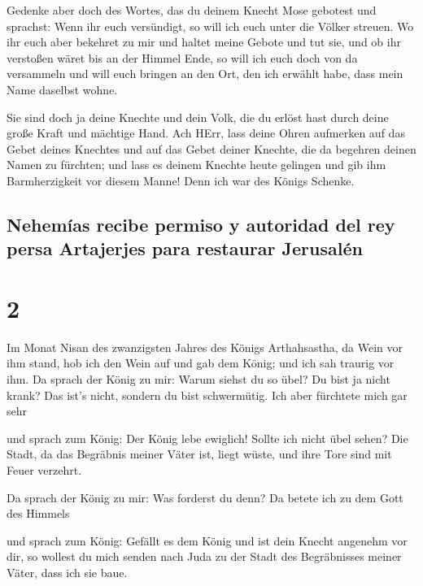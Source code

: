  Gedenke aber doch des Wortes, das du deinem Knecht Mose
gebotest und sprachst: Wenn ihr euch versündigt, so will ich euch unter
die Völker streuen.  Wo ihr euch aber bekehret zu mir und
haltet meine Gebote und tut sie, und ob ihr verstoßen wäret bis an der
Himmel Ende, so will ich euch doch von da versammeln und will euch
bringen an den Ort, den ich erwählt habe, dass mein Name daselbst wohne.

 Sie sind doch ja deine Knechte und dein Volk, die du
erlöst hast durch deine große Kraft und mächtige Hand. 
Ach HErr, lass deine Ohren aufmerken auf das Gebet deines Knechtes und
auf das Gebet deiner Knechte, die da begehren deinen Namen zu fürchten;
und lass es deinem Knechte heute gelingen und gib ihm Barmherzigkeit vor
diesem Manne! Denn ich war des Königs Schenke.

\hypertarget{nehemuxedas-recibe-permiso-y-autoridad-del-rey-persa-artajerjes-para-restaurar-jerusaluxe9n}{%
\subsection{Nehemías recibe permiso y autoridad del rey persa Artajerjes
para restaurar
Jerusalén}\label{nehemuxedas-recibe-permiso-y-autoridad-del-rey-persa-artajerjes-para-restaurar-jerusaluxe9n}}

\hypertarget{section-1}{%
\section{2}\label{section-1}}

 Im Monat Nisan des zwanzigsten Jahres des Königs
Arthahsastha, da Wein vor ihm stand, hob ich den Wein auf und gab dem
König; und ich sah traurig vor ihm.  Da sprach der König
zu mir: Warum siehst du so übel? Du bist ja nicht krank? Das ist's
nicht, sondern du bist schwermütig. Ich aber fürchtete mich gar sehr

 und sprach zum König: Der König lebe ewiglich! Sollte ich
nicht übel sehen? Die Stadt, da das Begräbnis meiner Väter ist, liegt
wüste, und ihre Tore sind mit Feuer verzehrt.

 Da sprach der König zu mir: Was forderst du denn? Da
betete ich zu dem Gott des Himmels

 und sprach zum König: Gefällt es dem König und ist dein
Knecht angenehm vor dir, so wollest du mich senden nach Juda zu der
Stadt des Begräbnisses meiner Väter, dass ich sie baue.


